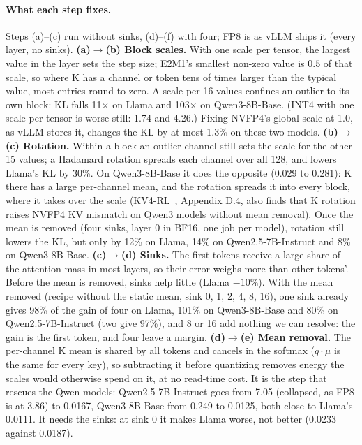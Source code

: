 \paragraph{What each step fixes.}
Steps (a)--(c) run without sinks, (d)--(f) with four; FP8 is as vLLM ships it (every layer, no sinks).
\textbf{(a)$\to$(b) Block scales.} With one scale per tensor, the largest value in the layer sets the step size;
E2M1's smallest non-zero value is $0.5$ of that scale, so where K has a channel or token tens of times larger than
the typical value, most entries round to zero. A scale per 16 values confines an outlier to its own block: KL falls
11$\times$ on Llama and 103$\times$ on Qwen3-8B-Base. (INT4 with one scale per tensor is worse still: 1.74 and 4.26.)
Fixing NVFP4's global scale at 1.0, as vLLM stores it, changes the KL by at most 1.3\% on these two models.
\textbf{(b)$\to$(c) Rotation.} Within a block an outlier channel still sets the scale for the other 15 values; a
Hadamard rotation spreads each channel over all 128, and lowers Llama's KL by 30\%. On Qwen3-8B-Base it does the
opposite (0.029 to 0.281): K there has a large per-channel mean, and the rotation spreads it into every block,
where it takes over the scale (KV4-RL~\cite{park2026kv4rl}, Appendix D.4, also finds that K rotation raises NVFP4 KV mismatch on Qwen3 models without mean removal). Once the mean is removed (four sinks, layer 0 in BF16, one job per model), rotation
still lowers the KL, but only by 12\% on Llama, 14\% on Qwen2.5-7B-Instruct and 8\% on Qwen3-8B-Base.
\textbf{(c)$\to$(d) Sinks.} The first tokens receive a large share of the attention mass in most layers, so their
error weighs more than other tokens'. Before the mean is removed, sinks help little (Llama $-10\%$). With the mean
removed (recipe without the static mean, sink 0, 1, 2, 4, 8, 16), one sink already gives 98\% of the gain of four on
Llama, 101\% on Qwen3-8B-Base and 80\% on Qwen2.5-7B-Instruct (two give 97\%), and 8 or 16 add nothing we can
resolve: the gain is the first token, and four leave a margin.
\textbf{(d)$\to$(e) Mean removal.} The per-channel K mean is shared by all tokens and cancels in the softmax
($q\cdot\mu$ is the same for every key), so subtracting it before quantizing removes energy the scales would
otherwise spend on it, at no read-time cost. It is the step that rescues the Qwen models: Qwen2.5-7B-Instruct
goes from 7.05 (collapsed, as FP8 is at 3.86) to 0.0167, Qwen3-8B-Base from 0.249 to 0.0125, both close to Llama's
0.0111. It needs the sinks: at sink 0 it makes Llama worse, not better (0.0233 against 0.0187).
